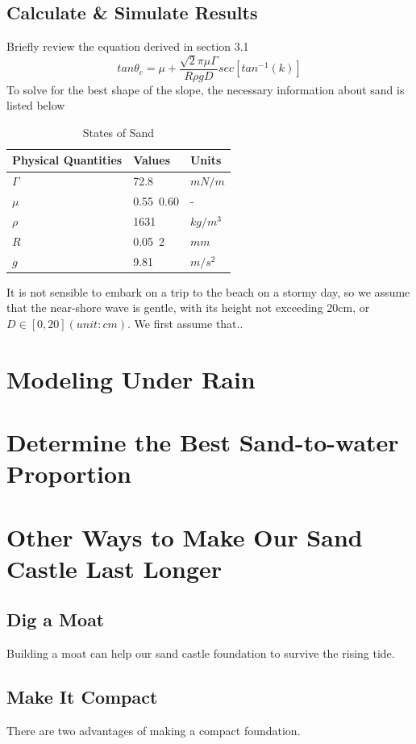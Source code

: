 \documentclass[12pt]{article}
\begin{document}
\subsection{Calculate \& Simulate Results}
Briefly review the equation derived in section 3.1
$$tan\theta_c = \mu + \frac{\sqrt{2}\pi\mu\Gamma}{R\rho gD}sec[tan^{-1}(k)]$$
To solve for the best shape of the slope, the necessary information about sand is listed below
\begin{table}[H]
	\caption{States of Sand}
	\vspace{10pt}
	\centering
	\begin{tabular}{p{4cm}p{2cm}p{2cm}}
		\hline
		Physical Quantities & Values & Units 	\\
		\hline
		$\Gamma$		  & 72.8   	    & $mN/m$              \\
		$\mu$  			  & 0.55~0.60   & -     	            \\
		$\rho$ 			  & 1631     &  $kg/m^3$          \\
		$R$ 			  & 0.05~2   & $mm$               \\
		$g$  			  & 9.81      & $m/s^2$     \\
		\hline
	\end{tabular}
	\label{bs2}
\end{table}
\par
It is not sensible to embark on a trip to the beach on a stormy day, so we assume that the near-shore wave is gentle, with its height not exceeding 20cm, or $D \in [0, 20](unit:cm)$.
We first assume that..

\section{Modeling Under Rain}

\section{Determine the Best Sand-to-water Proportion}
\section{Other Ways to Make Our Sand Castle Last Longer}
\subsection{Dig a Moat}
Building a moat can help our sand castle foundation to survive the rising tide. 
\subsection{Make It Compact}
There are two advantages of making a compact foundation.
\end{document}
